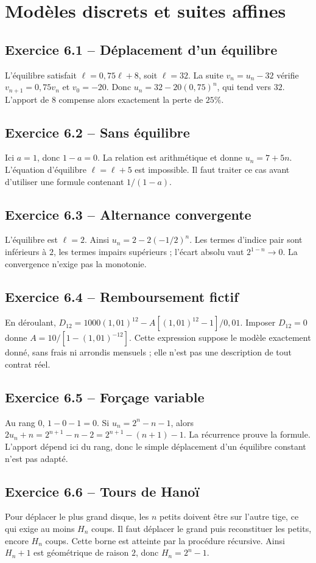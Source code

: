 \chapter{Modèles discrets et suites affines}
\section*{Exercice 6.1 -- Déplacement d'un équilibre}
L'équilibre satisfait $\ell=0{,}75\ell+8$, soit $\ell=32$. La suite $v_n=u_n-32$ vérifie $v_{n+1}=0{,}75v_n$ et $v_0=-20$. Donc $u_n=32-20(0{,}75)^n$, qui tend vers $32$. L'apport de $8$ compense alors exactement la perte de $25\%$.

\section*{Exercice 6.2 -- Sans équilibre}
Ici $a=1$, donc $1-a=0$. La relation est arithmétique et donne $u_n=7+5n$. L'équation d'équilibre $\ell=\ell+5$ est impossible. Il faut traiter ce cas avant d'utiliser une formule contenant $1/(1-a)$.

\section*{Exercice 6.3 -- Alternance convergente}
L'équilibre est $\ell=2$. Ainsi $u_n=2-2(-1/2)^n$. Les termes d'indice pair sont inférieurs à $2$, les termes impairs supérieurs ; l'écart absolu vaut $2^{1-n}\to0$. La convergence n'exige pas la monotonie.

\section*{Exercice 6.4 -- Remboursement fictif}
En déroulant, $D_{12}=1000(1{,}01)^{12}-A[(1{,}01)^{12}-1]/0{,}01$. Imposer $D_{12}=0$ donne $A=10/[1-(1{,}01)^{-12}]$. Cette expression suppose le modèle exactement donné, sans frais ni arrondis mensuels ; elle n'est pas une description de tout contrat réel.

\section*{Exercice 6.5 -- Forçage variable}
Au rang $0$, $1-0-1=0$. Si $u_n=2^n-n-1$, alors $2u_n+n=2^{n+1}-n-2=2^{n+1}-(n+1)-1$. La récurrence prouve la formule. L'apport dépend ici du rang, donc le simple déplacement d'un équilibre constant n'est pas adapté.

\section*{Exercice 6.6 -- Tours de Hanoï}
Pour déplacer le plus grand disque, les $n$ petits doivent être sur l'autre tige, ce qui exige au moins $H_n$ coups. Il faut déplacer le grand puis reconstituer les petits, encore $H_n$ coups. Cette borne est atteinte par la procédure récursive. Ainsi $H_n+1$ est géométrique de raison $2$, donc $H_n=2^n-1$.
